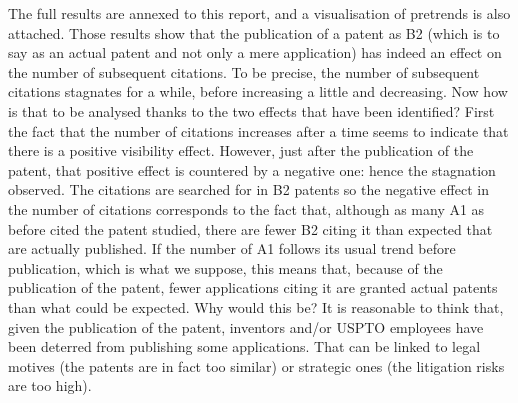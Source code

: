 \documentclass[12pt]{article}
\begin{document}
The full results are annexed to this report, and a visualisation of pretrends is also attached. Those results show that the publication of a patent as B2 (which is to say as an actual patent and not only a mere application) has indeed an effect on the number of subsequent citations. To be precise, the number of subsequent citations stagnates for a while, before increasing a little and decreasing. Now how is that to be analysed thanks to the two effects that have been identified? First the fact that the number of citations increases after a time seems to indicate that there is a positive visibility effect. However, just after the publication of the patent, that positive effect is countered by a negative one: hence the stagnation observed. The citations are searched for in B2 patents so the negative effect in the number of citations corresponds to the fact that, although as many A1 as before cited the patent studied, there are fewer B2 citing it than expected that are actually published. If the number of A1 follows its usual trend before publication, which is what we suppose, this means that, because of the publication of the patent, fewer applications citing it are granted actual patents than what could be expected. Why would this be? It is reasonable to think that, given the publication of the patent, inventors and/or USPTO employees have been deterred from publishing some applications. That can be linked to legal motives (the patents are in fact too similar) or strategic ones (the litigation risks are too high). 
\end{document}
